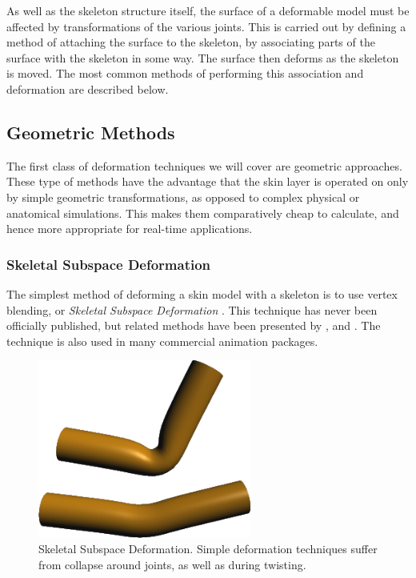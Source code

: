 As well as the skeleton structure itself, the surface of a deformable model must be affected by transformations of the various joints. This is carried out by defining a method of attaching the surface to the skeleton, by associating parts of the surface with the skeleton in some way. The surface then deforms as the skeleton is moved. The most common methods of performing this association and deformation are described below.

\subsection{\label{sec:litreview:animation:geometric}Geometric Methods}

The first class of deformation techniques we will cover are geometric approaches. These type of methods have the advantage that the skin layer is operated on only by simple geometric transformations, as opposed to complex physical or anatomical simulations. This makes them comparatively cheap to calculate, and hence more appropriate for real-time applications. 

\subsubsection{\label{sec:litreview:animation:geometric:ssd}Skeletal Subspace Deformation}

The simplest method of deforming a skin model with a skeleton is to use vertex blending, or {\it Skeletal Subspace Deformation} \cite{Akenine02}. This technique has never been officially published, but related methods have been presented by \citet{Komatsu88}, and \citet{Magnenat-Thalmann88}. The technique is also used in many commercial animation packages.

\begin{figure}
\begin{center}
\includegraphics[width=7cm]{../images/bend}
\caption[Skeletal Subspace Deformation]{\label{fig:ssd} Skeletal Subspace Deformation. Simple deformation techniques suffer from collapse around joints, as well as during twisting.}
\end{center}
\end{figure}

